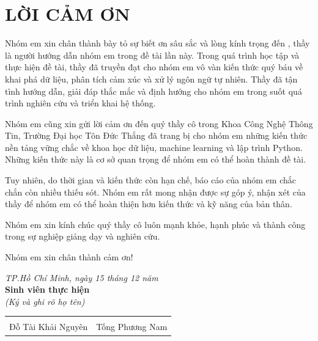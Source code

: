 \section*{LỜI CẢM ƠN}
	Nhóm em xin chân thành bày tỏ sự biết ơn sâu sắc và lòng kính trọng đến \gvhd, thầy là người hướng dẫn nhóm em trong đề tài lần này. Trong quá trình học tập và thực hiện đề tài, thầy đã truyền đạt cho nhóm em vô vàn kiến thức quý báu về khai phá dữ liệu, phân tích cảm xúc và xử lý ngôn ngữ tự nhiên. Thầy đã tận tình hướng dẫn, giải đáp thắc mắc và định hướng cho nhóm em trong suốt quá trình nghiên cứu và triển khai hệ thống.

	Nhóm em cũng xin gửi lời cảm ơn đến quý thầy cô trong Khoa Công Nghệ Thông Tin, Trường Đại học Tôn Đức Thắng đã trang bị cho nhóm em những kiến thức nền tảng vững chắc về khoa học dữ liệu, machine learning và lập trình Python. Những kiến thức này là cơ sở quan trọng để nhóm em có thể hoàn thành đề tài.

	Tuy nhiên, do thời gian và kiến thức còn hạn chế, báo cáo của nhóm em chắc chắn còn nhiều thiếu sót. Nhóm em rất mong nhận được sự góp ý, nhận xét của thầy để nhóm em có thể hoàn thiện hơn kiến thức và kỹ năng của bản thân.

    Nhóm em xin kính chúc quý thầy cô luôn mạnh khỏe, hạnh phúc và thành công trong sự nghiệp giảng dạy và nghiên cứu. 
    
    Nhóm em xin chân thành cảm ơn!

\vspace{0.5cm}
\begin{flushright}
    \begin{minipage}[t]{0.6\textwidth}
        \raggedleft
        \textit{TP.Hồ Chí Minh, ngày 15 tháng 12 năm \nam}\\[0.3cm]
        \textbf{Sinh viên thực hiện}\\[0.2cm]
        \textit{(Ký và ghi rõ họ tên)}\\[1.8cm]
        \begin{tabular}{cc}
            \underline{\hspace{5cm}} & \underline{\hspace{5cm}} \\
            Đỗ Tài Khải Nguyên & Tống Phương Nam \\
        \end{tabular}
    \end{minipage}
\end{flushright}